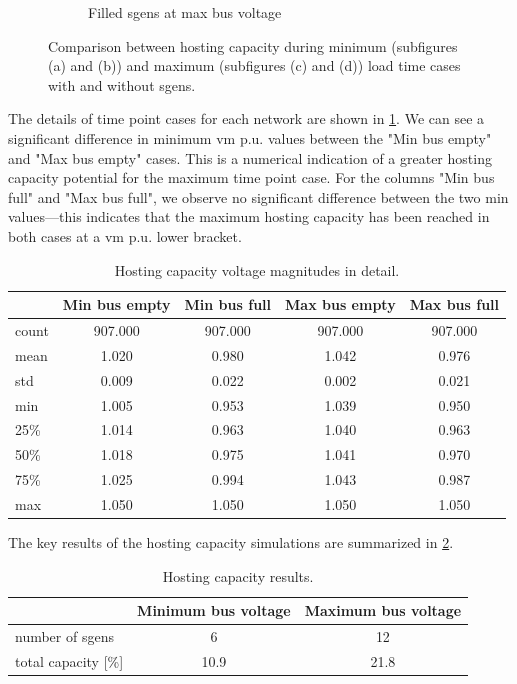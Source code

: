 \documentclass[a4paper,10pt]{report}
\begin{document}
\begin{figure}
\begin{subfigure}[b]{0.475\textwidth}
		\caption[]
		{{\small Filled sgens at max bus voltage}}    
		\label{hopsting_cap_figures_d}
	\end{subfigure}
	\caption[Comparison of hosting capacities for time extremes]
	{\small Comparison between hosting capacity during minimum (subfigures (a) and (b)) and maximum (subfigures (c) and (d)) load time cases with and without sgens.} 
	\label{hopsting_cap_figures}
\end{figure}
\FloatBarrier

The details of time point cases for each network are shown in \cref{extremes_summary}. We can see a significant difference in minimum vm p.u. values between the "Min bus empty" and "Max bus empty" cases. This is a numerical indication of a greater hosting capacity potential for the maximum time point case. For the columns "Min bus full" and "Max bus full", we observe no significant difference between the two min values---this indicates that the maximum hosting capacity has been reached in both cases at a vm p.u. lower bracket.

\begin{table}[htpb]
	\centering
	\begin{tabular}{lcccc}
		\toprule
		& Min bus empty & Min bus full & Max bus empty & Max bus full \\
		\midrule
		count & 907.000 & 907.000 & 907.000 & 907.000 \\
		mean & 1.020 & 0.980 & 1.042 & 0.976 \\
		std & 0.009 & 0.022 & 0.002 & 0.021 \\
		min & 1.005 & 0.953 & 1.039 & 0.950 \\
		25\% & 1.014 & 0.963 & 1.040 & 0.963 \\
		50\% & 1.018 & 0.975 & 1.041 & 0.970 \\
		75\% & 1.025 & 0.994 & 1.043 & 0.987 \\
		max & 1.050 & 1.050 & 1.050 & 1.050 \\
		\bottomrule
	\end{tabular}
	\caption[Hosting capacity voltage magnitudes in detail]{Hosting capacity voltage magnitudes in detail.}
	\label{extremes_summary}
\end{table}

The key results of the hosting capacity simulations are summarized in \cref{hosting_cap_stats}.

\begin{table}[htpb]
	\centering
	\begin{tabular}{lcc}
		\toprule
		& Minimum bus voltage & Maximum bus voltage \\
		\midrule
		number of sgens & 6 & 12 \\
		total capacity [\%] & 10.9 & 21.8 \\
		\bottomrule
	\end{tabular}
	\caption[Hosting capacity results]{Hosting capacity results.}
	\label{hosting_cap_stats}
\end{table}
\end{document}
